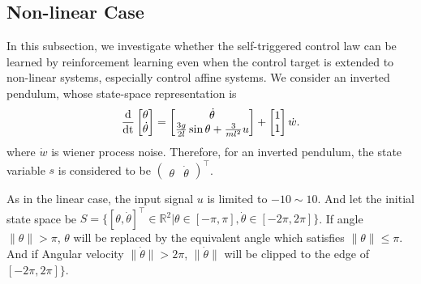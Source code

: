 \documentclass[english, dvipdfmx]{ampmt}             %
\newcommand{\odif}[2]{\frac{\rm{d}#1}{\rm{d}#2}}
\begin{document}
\subsection{Non-linear Case}
In this subsection, we investigate whether the self-triggered control law can be learned by reinforcement learning even when the control target is extended to non-linear systems, especially control affine systems. We consider an inverted pendulum, whose state-space representation is
\begin{equation}
	\odif{}{t}\begin{bmatrix}\theta \\ \dot{\theta}\end{bmatrix} = 
		\begin{bmatrix}\dot{\theta} \\ \frac{3g}{2l}\sin{\theta} + \frac{3}{ml^2}u \end{bmatrix} + \begin{bmatrix}1 \\ 1\end{bmatrix}\dot{w}\label{pendulum}.
\end{equation}
where $\dot{w}$ is wiener process noise. Therefore, for an inverted pendulum, the state variable $s$ is considered to be $\begin{pmatrix}\theta & \dot{\theta}\end{pmatrix}^{\top}$.
\par
As in the linear case, the input signal $u$ is limited to $-10 \sim 10$. And let the initial state space be $S = \{[\theta, \dot{\theta}]^{\top}\in \mathbb{R}^2| \theta\in[-\pi,\pi], \dot{\theta}\in[-2\pi,2\pi]\}$. 
If angle $\|\theta\| > \pi$, $\theta$ will be replaced by the equivalent angle which satisfies $\|\theta\| \leq \pi$. And if Angular velocity $\|\dot{\theta}\| > 2\pi$, $\|\dot{\theta}\|$ will be clipped to the edge of $[-2\pi,2\pi]\}$.
\fi
\end{document}
